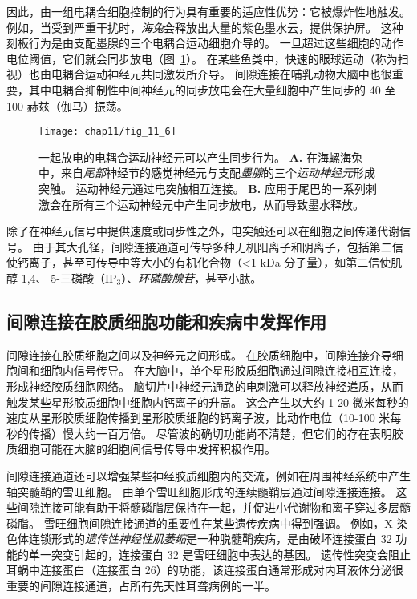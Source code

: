 因此，由一组电耦合细胞控制的行为具有重要的适应性优势：它被爆炸性地触发。
例如，当受到严重干扰时，\textit{海兔}会释放出大量的紫色墨水云，提供保护屏。
这种刻板行为是由支配墨腺的三个电耦合运动细胞介导的。
一旦超过这些细胞的动作电位阈值，它们就会同步放电（图~\ref{fig:11_6}）。
在某些鱼类中，快速的眼球运动（称为扫视）也由电耦合运动神经元共同激发所介导。
间隙连接在哺乳动物大脑中也很重要，其中电耦合抑制性中间神经元的同步放电会在大量细胞中产生同步的 40 至 100 赫兹（伽马）振荡。


\begin{figure}[htbp]
	\centering
	\texttt{[image: chap11/fig\_11\_6]}
	\caption{一起放电的电耦合运动神经元可以产生同步行为\cite{carew1976two}。 
		\textbf{A.} 在海螺海兔中，来自\textit{尾部}神经节的感觉神经元与支配\textit{墨腺}的三个\textit{运动神经元}形成突触。
		运动神经元通过电突触相互连接。
		\textbf{B.} 应用于尾巴的一系列刺激会在所有三个运动神经元中产生同步放电，从而导致墨水释放。}
	\label{fig:11_6}
\end{figure}


除了在神经元信号中提供速度或同步性之外，电突触还可以在细胞之间传递代谢信号。
由于其大孔径，间隙连接通道可传导多种无机阳离子和阴离子，包括第二信使钙离子，甚至可传导中等大小的有机化合物（<1 kDa 分子量），如第二信使肌醇 1,4、 5-三磷酸（IP$_3$）、\textit{环磷酸腺苷}，甚至小肽。



\subsection{间隙连接在胶质细胞功能和疾病中发挥作用}

间隙连接在胶质细胞之间以及神经元之间形成。
在胶质细胞中，间隙连接介导细胞间和细胞内信号传导。 
在大脑中，单个星形胶质细胞通过间隙连接相互连接，形成神经胶质细胞网络。
脑切片中神经元通路的电刺激可以释放神经递质，从而触发某些星形胶质细胞中细胞内钙离子的升高。
这会产生以大约 1-20 微米每秒的速度从星形胶质细胞传播到星形胶质细胞的钙离子波，比动作电位（10-100 米每秒的传播）慢大约一百万倍。
尽管波的确切功能尚不清楚，但它们的存在表明胶质细胞可能在大脑的细胞间信号传导中发挥积极作用。


间隙连接通道还可以增强某些神经胶质细胞内的交流，例如在周围神经系统中产生轴突髓鞘的雪旺细胞。
由单个雪旺细胞形成的连续髓鞘层通过间隙连接连接。
这些间隙连接可能有助于将髓磷脂层保持在一起，并促进小代谢物和离子穿过多层髓磷脂。
雪旺细胞间隙连接通道的重要性在某些遗传疾病中得到强调。
例如，X 染色体连锁形式的\textit{遗传性神经性肌萎缩}是一种脱髓鞘疾病，是由破坏连接蛋白 32 功能的单一突变引起的，连接蛋白 32 是雪旺细胞中表达的基因。
遗传性突变会阻止耳蜗中连接蛋白（连接蛋白 26）的功能，该连接蛋白通常形成对内耳液体分泌很重要的间隙连接通道，占所有先天性耳聋病例的一半。



